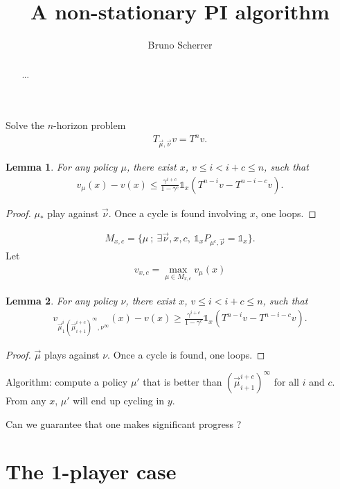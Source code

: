 \documentclass{article}
\title{A non-stationary PI algorithm}
\author{Bruno Scherrer}
\newtheorem{lemma}{Lemma}
\def\1{{\mathds 1}}
\begin{document}
\maketitle

\begin{abstract}
...
\end{abstract}


Solve the $n$-horizon problem
\begin{align}
  T_{\vec\mu,\vec\nu} v = T^n v.
\end{align}


\begin{lemma}
  For any policy $\mu$, there exist $x$, $v \le i < i+c \le n$, such that
  \begin{align}
    v_{\mu}(x) - v(x) \le \frac{\gamma^{i+c}}{1-\gamma^c} \1_x (T^{n-i} v - T^{n-i-c} v).
  \end{align}
\end{lemma}
\begin{proof}
$\mu_*$ play against $\vec\nu$. Once a cycle is found involving $x$, one loops.
\end{proof}

\begin{align}
  M_{x,c} = \{ \mu ~;~ \exists \vec\nu,x,c,~ \1_x P_{\mu^c,\vec\nu} = \1_x \}.
\end{align}
Let
\begin{align}
  v_{x,c} = \max_{\mu \in M_{x,c}} v_\mu(x)
\end{align}

\begin{lemma}
  For any policy $\nu$, there exist $x$,  $v \le i < i+c \le n$, such that
  \begin{align}
    v_{\vec\mu_1^i(\vec\mu_{i+1}^{i+c})^\infty,\nu^\infty}(x) -v(x) \ge \frac{\gamma^{i+c}}{1-\gamma^c} \1_x (T^{n-i} v - T^{n-i-c} v).
  \end{align}
\end{lemma}
\begin{proof}
  $\vec\mu$ plays against $\nu$. Once a cycle is found, one loops.
\end{proof}

Algorithm: compute a policy $\mu'$ that is better than $(\vec\mu_{i+1}^{i+c})^\infty$ for all $i$ and $c$. From any $x$, $\mu'$ will end up cycling in $y$.

Can we guarantee that one makes significant progress ?



\section{The 1-player case}
\end{document}
